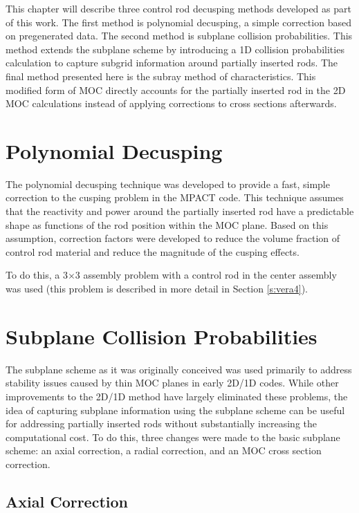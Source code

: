 This chapter will describe three control rod decusping methods developed as part of this work.  The first method is polynomial decusping, a simple correction based on pregenerated data.  The second method is subplane collision probabilities.  This method extends the subplane scheme by introducing a 1D collision probabilities calculation to capture subgrid information around partially inserted rods.  The final method presented here is the subray method of characteristics.  This modified form of MOC directly accounts for the partially inserted rod in the 2D MOC calculations instead of applying corrections to cross sections afterwards.

\section{Polynomial Decusping}

The polynomial decusping technique was developed to provide a fast, simple correction to the cusping problem in the MPACT code.  This technique assumes that the reactivity and power around the partially inserted rod have a predictable shape as functions of the rod position within the MOC plane.  Based on this assumption, correction factors were developed to reduce the volume fraction of control rod material and reduce the magnitude of the cusping effects.

To do this, a 3$\times$3 assembly problem with a control rod in the center assembly was used (this problem is described in more detail in Section \ref{s:vera4}).  

\section{Subplane Collision Probabilities}

The subplane scheme as it was originally conceived was used primarily to address stability issues caused by thin MOC planes in early 2D/1D codes.  While other improvements to the 2D/1D method have largely eliminated these problems, the idea of capturing subplane information using the subplane scheme can be useful for addressing partially inserted rods without substantially increasing the computational cost.  To do this, three changes were made to the basic subplane scheme: an axial correction, a radial correction, and an MOC cross section correction.

\subsection{Axial Correction}

